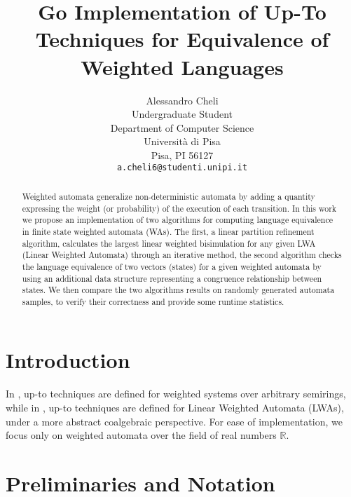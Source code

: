 \documentclass{article}
\title{Go Implementation of Up-To Techniques for Equivalence of Weighted Languages}
\author{
  Alessandro Cheli \\
  Undergraduate Student \\
  Department of Computer Science \\
  Università di Pisa\\
  Pisa, PI 56127 \\
  \texttt{a.cheli6@studenti.unipi.it} \\
}
\theoremstyle{plain}%
\theoremstyle{definition}
\theoremstyle{remark}
\def\R{\mathbb{R}}
\begin{document}
\maketitle

\begin{abstract}
Weighted automata generalize non-deterministic automata by adding
a quantity expressing the weight (or probability) of the execution of each transition.
In this work we propose an implementation of two algorithms for computing language 
equivalence in finite state weighted automata (WAs). The first, a
linear partition refinement algorithm, calculates the largest linear weighted bisimulation
for any given LWA (Linear Weighted Automata) through an iterative method, 
the second algorithm checks the language equivalence 
of two vectors (states) for a given weighted automata by using an additional
data structure representing a congruence relationship between states.
We then compare the two algorithms results on randomly generated automata samples,
to verify their correctness and provide some runtime statistics.

\end{abstract}




\section{Introduction}
\label{sec:intro}

In \cite{DBLP:journals/corr/Bonchi0K17}, up-to techniques are defined for
weighted systems over arbitrary semirings, while in \cite{BONCHI201277}, up-to techniques
are defined for Linear Weighted Automata (LWAs), under a more abstract coalgebraic perspective.
For ease of implementation, we focus only on weighted automata over the field of real numbers 
$\R$. 

\section{Preliminaries and Notation}
\label{sec:notation}
\end{document}
